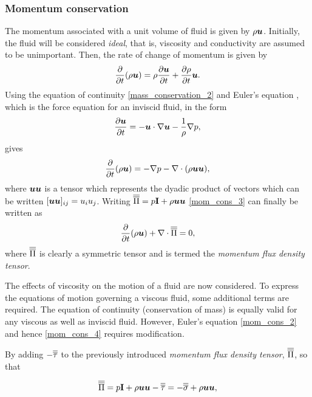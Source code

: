 \subsubsection{Momentum conservation}
The momentum associated with a unit volume of fluid is given by $\rho{\mbox{\boldmath$u$}}$. Initially, the fluid will be considered \textit{ideal}, that is, viscosity and conductivity are assumed to be unimportant. Then, the rate of change of momentum is given by
\begin{equation}\label{mom_cons_1}
 \frac{\partial}{\partial{t}}(\rho{\mbox{\boldmath$u$}})=\rho\frac{\partial{\mbox{\boldmath$u$}}}{\partial{t}}+\frac{\partial\rho}{\partial{t}}{\mbox{\boldmath$u$}}.
\end{equation}
Using the equation of continuity \eqref{mass_conservation_2} and Euler's
equation \citep{batchelor1967}, which is the force equation for an inviscid fluid, in the form
\begin{equation}\label{mom_cons_2}
 \frac{\partial{\mbox{\boldmath$u$}}}{\partial{t}}=-{\mbox{\boldmath$u$}}\cdot\nabla{\mbox{\boldmath$u$}}-\frac{1}{\rho}\nabla{p},
\end{equation}
gives
\begin{equation}\label{mom_cons_3}
 \frac{\partial}{\partial{t}}(\rho{\mbox{\boldmath$u$}})=-\nabla{p}-\nabla\cdot(\rho{\mbox{\boldmath$u$}}{\mbox{\boldmath$u$}}),
\end{equation}
where ${\mbox{\boldmath$u$}}{\mbox{\boldmath$u$}}$ is a tensor which represents the dyadic product of vectors which can be written $[{\mbox{\boldmath$u$}}{\mbox{\boldmath$u$}}]_{ij}=u_{i}u_{j}$. Writing $\overline{\overline{\Pi}}=p\mathbf{I}+\rho{\mbox{\boldmath$u$}}{\mbox{\boldmath$u$}}$ \eqref{mom_cons_3} can finally be written as
\begin{equation}\label{mom_cons_4}
 \frac{\partial}{\partial{t}}(\rho{\mbox{\boldmath$u$}})+\nabla\cdot\overline{\overline{\Pi}}=0,
\end{equation}
where $\overline{\overline{\Pi}}$ is clearly a symmetric tensor and is termed the \textit{momentum flux density tensor}.

The effects of viscosity on the motion of a fluid are now considered. To express the equations of motion governing a viscous fluid, some additional terms are required. The equation of continuity (conservation of mass) is equally valid for any viscous as well as inviscid fluid. However, Euler's equation \eqref{mom_cons_2} and hence \eqref{mom_cons_4} requires modification.

By adding $-\overline{\overline{\tau}}$ to the previously introduced \textit{momentum flux density tensor}, $\overline{\overline{\Pi}}$, so that

\begin{equation}
 \overline{\overline{\Pi}}=p\mathbf{I}+\rho{\mbox{\boldmath$u$}}{\mbox{\boldmath$u$}}-\overline{\overline{\tau}}=-\overline{\overline{\sigma}}+\rho{\mbox{\boldmath$u$}}{\mbox{\boldmath$u$}},
\end{equation}


